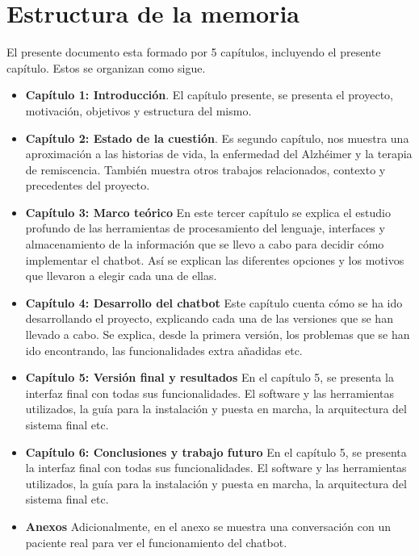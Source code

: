 \section{Estructura de la memoria}
El presente documento esta formado por 5  capítulos, incluyendo el presente capítulo. Estos se organizan como sigue. 
\begin{itemize}
	\item \textbf{Capítulo 1: Introducción}. El capítulo presente, se presenta el proyecto, motivación, objetivos y estructura del mismo. 
	\item \textbf{Capítulo 2: Estado de la cuestión}. Es segundo capítulo, nos muestra una aproximación a las historias de vida, la enfermedad del Alzhéimer y la terapia de remiscencia. También muestra otros trabajos relacionados, contexto y precedentes del proyecto. 
	\item \textbf{Capítulo 3: Marco teórico} En este tercer capítulo se explica el estudio profundo de las herramientas de procesamiento del lenguaje, interfaces y almacenamiento de la información que se llevo a cabo para decidir cómo implementar el chatbot. Así se explican las diferentes opciones y los motivos que llevaron a elegir cada una de ellas. 
	\item \textbf{Capítulo 4: Desarrollo del chatbot}
	Este capítulo cuenta cómo se ha ido desarrollando el proyecto, explicando cada una de las versiones que se han llevado a cabo. Se explica, desde la primera versión, los problemas que se han ido encontrando, las funcionalidades extra añadidas etc. 
	\item \textbf{Capítulo 5: Versión final y resultados}
	En el capítulo 5, se presenta la interfaz final con todas sus funcionalidades. El software y las herramientas utilizados, la guía para la instalación y puesta en marcha, la arquitectura del sistema final etc. 
	\item \textbf{Capítulo 6: Conclusiones y trabajo futuro}
	En el capítulo 5, se presenta la interfaz final con todas sus funcionalidades. El software y las herramientas utilizados, la guía para la instalación y puesta en marcha, la arquitectura del sistema final etc. 
	\item \textbf{Anexos} Adicionalmente, en el anexo se muestra una conversación con un paciente real para ver el funcionamiento del chatbot. 
	
\end{itemize}



